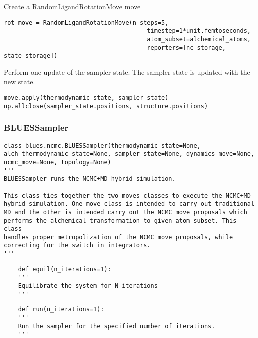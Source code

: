 \begin{description}
Create a RandomLigandRotationMove move

\begin{verbatim}
rot_move = RandomLigandRotationMove(n_steps=5,
                                        timestep=1*unit.femtoseconds,
                                        atom_subset=alchemical_atoms,
                                        reporters=[nc_storage, state_storage])
\end{verbatim}

Perform one update of the sampler state. The sampler state is updated
with the new state.

\begin{verbatim}
move.apply(thermodynamic_state, sampler_state)
np.allclose(sampler_state.positions, structure.positions)
\end{verbatim}
\end{description}

\hypertarget{bluessampler}{%
\subsubsection{BLUESSampler}\label{bluessampler}}

\begin{verbatim}
class blues.ncmc.BLUESSampler(thermodynamic_state=None, alch_thermodynamic_state=None, sampler_state=None, dynamics_move=None, ncmc_move=None, topology=None)
'''
BLUESSampler runs the NCMC+MD hybrid simulation.

This class ties together the two moves classes to execute the NCMC+MD
hybrid simulation. One move class is intended to carry out traditional
MD and the other is intended carry out the NCMC move proposals which
performs the alchemical transformation to given atom subset. This class
handles proper metropolization of the NCMC move proposals, while
correcting for the switch in integrators.
'''
\end{verbatim}


\begin{description}
\item[Methods]
\item 
    \begin{verbatim}
    def equil(n_iterations=1):
    '''
    Equilibrate the system for N iterations
    '''
    \end{verbatim}
    
    \begin{verbatim}
    def run(n_iterations=1):
    '''
    Run the sampler for the specified number of iterations.
    '''
    \end{verbatim}
\end{description}

